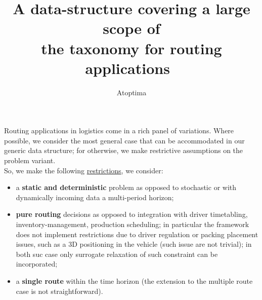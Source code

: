 \documentclass[12pt,a4paper]{article}
\title{A data-structure covering a large scope of \\ the taxonomy for routing applications}
\author{Atoptima}
\begin{document}
\maketitle

Routing applications in logistics come in a rich panel of variations. Where possible, we consider the most general case that can be accommodated in our generic data structure; for otherwise, we make restrictive assumptions on the problem variant. \\

\noindent So, we make the following \underline{restrictions}, we consider:
\begin{itemize}
\item a {\bf static and deterministic} problem as opposed to stochastic or with dynamically incoming data a multi-period horizon;
\item {\bf pure routing} decisions as opposed to integration with driver timetabling, inventory-management, production scheduling; in particular the framework does not implement restrictions due to driver regulation or packing placement issues, such as  a 3D positioning in the vehicle (such issue are not trivial); in both suc case only surrogate relaxation of such constraint can be incorporated;
\item a {\bf single route} within the time horizon (the extension to the multiple route case is not straightforward).
\end{itemize}
\end{document}
